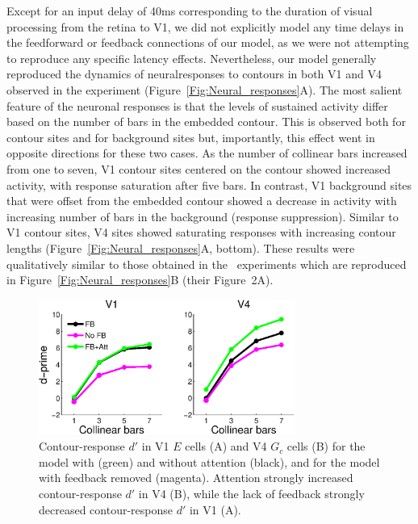 Except for an input delay of 40ms corresponding to the duration of
visual processing from the retina to V1, we did not explicitly model
any time delays in the feedforward or feedback connections of our model, as we were not attempting to reproduce any specific latency effects. Nevertheless, our model generally reproduced the dynamics of neuralresponses to contours in both V1 and V4 observed in the \cite{Chen_etal14} experiment (Figure~\ref{Fig:Neural_responses}A).
The most salient feature of the neuronal responses is that the levels of sustained activity differ based on the number of bars in the embedded contour. This is observed both for contour sites and for
background sites but, importantly, this effect went in opposite directions for these two cases.  As the number of collinear bars
increased from one to seven, V1 contour sites centered on the contour
showed increased activity, with response saturation after five bars. In contrast, V1 background sites that were offset from the embedded contour showed a decrease in activity with increasing number of bars in the background (response suppression). Similar to V1 contour sites, V4 sites showed saturating responses with increasing contour lengths (Figure~\ref{Fig:Neural_responses}A, bottom).  These results were qualitatively similar to those obtained in the~\cite{Chen_etal14} experiments which are reproduced in Figure~\ref{Fig:Neural_responses}B (their Figure~2A).

\begin{figure}[htbp]
\centering
\includegraphics[width=0.75\textwidth]{Contour/figs/Fig5.eps}
\makeatletter
\let\@currsize\normalsize
\caption{Contour-response $d'$ in V1 $E$ cells (A) and V4 $G_c$ cells (B) for the model with (green) and without attention (black), and for the model with feedback removed (magenta). Attention strongly increased
contour-response $d'$ in V4 (B), while the lack of feedback strongly
decreased contour-response $d'$ in V1 (A).}
\label{Fig:FB_att}
\end{figure}

